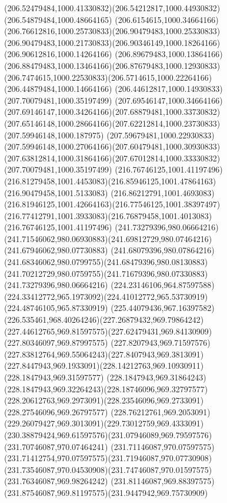 {{\curveto(206.52479484,1000.41330832)(206.54212817,1000.44930832)(206.54879484,1000.48664165)
\curveto(206.6154615,1000.34664166)(206.76612816,1000.25730833)(206.90479483,1000.25330833)
\curveto(206.90479483,1000.21730833)(206.90346149,1000.18264166)(206.90612816,1000.14264166)
\curveto(206.89679483,1000.13864166)(206.88479483,1000.13464166)(206.87679483,1000.12930833)
\curveto(206.7474615,1000.22530833)(206.5714615,1000.22264166)(206.44879484,1000.14664166)
\lineto(206.44612817,1000.14930833)
\moveto(207.70079481,1000.35197499)
\curveto(207.69546147,1000.34664166)(207.69146147,1000.34264166)(207.68879481,1000.33730832)
\curveto(207.65146148,1000.28664166)(207.62212814,1000.23730833)(207.59946148,1000.187975)
\curveto(207.59679481,1000.22930833)(207.59946148,1000.27064166)(207.60479481,1000.30930833)
\curveto(207.63812814,1000.31864166)(207.67012814,1000.33330832)(207.70079481,1000.35197499)
\moveto(216.76746125,1001.41197496)
\curveto(216.81279458,1001.4453083)(216.85946125,1001.47864163)(216.90479458,1001.5133083)
\curveto(216.86212791,1001.4693083)(216.81946125,1001.42664163)(216.77546125,1001.38397497)
\curveto(216.77412791,1001.3933083)(216.76879458,1001.4013083)(216.76746125,1001.41197496)
\moveto(241.73279396,980.06664216)
\curveto(241.71546062,980.06930883)(241.69812729,980.07464216)(241.67946062,980.07730883)
\curveto(241.68079396,980.07864216)(241.68346062,980.0799755)(241.68479396,980.08130883)
\curveto(241.70212729,980.0759755)(241.71679396,980.07330883)(241.73279396,980.06664216)
\moveto(224.23146106,964.87597588)
\curveto(224.33412772,965.1973092)(224.41012772,965.53730919)(224.48746105,965.87330919)
\curveto(225.44079436,967.16397582)(226.535461,968.40264246)(227.26879432,969.79864242)
\curveto(227.44612765,969.81597575)(227.62479431,969.84130909)(227.80346097,969.87997575)
\curveto(227.8207943,969.71597576)(227.83812764,969.55064243)(227.8407943,969.3813091)
\curveto(227.8447943,969.1933091)(228.14212763,969.10930911)(228.1847943,969.31597577)
\curveto(228.1847943,969.31864243)(228.1847943,969.32264243)(228.18746096,969.32797577)
\curveto(228.20612763,969.2973091)(228.23546096,969.2733091)(228.27546096,969.26797577)
\curveto(228.76212761,969.2053091)(229.26079427,969.3013091)(229.73012759,969.4333091)
\curveto(230.38879424,969.61597576)(231.07946089,969.79597576)(231.70746087,970.07464241)
\curveto(231.71146087,970.07597575)(231.71412754,970.07597575)(231.71946087,970.07730908)
\curveto(231.73546087,970.04530908)(231.74746087,970.01597575)(231.76346087,969.98264242)
\curveto(231.81146087,969.88397575)(231.87546087,969.81197575)(231.9447942,969.75730909)
}}

